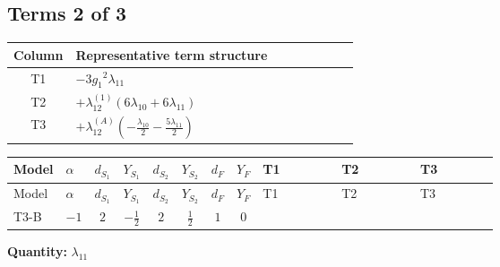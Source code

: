 \documentclass[8pt]{article}
\begin{document}
\begin{landscape}
\subsection*{Terms 2 of 3}
\begin{center}
\begin{tabular}{@{}c >{\raggedright\arraybackslash}p{0.82\linewidth}@{}}
\toprule
Column & Representative term structure \\
\midrule
T1 & \(\displaystyle -3 {g_1}^2 {\lambda_{11}}\) \\
\midrule
T2 & \(\displaystyle +{\lambda_{12}^{(1)}} (6 {\lambda_{10}}+6 {\lambda_{11}})\) \\
\midrule
T3 & \(\displaystyle +{\lambda_{12}^{(A)}} \left(-\frac{{\lambda_{10}}}{2}-\frac{5 {\lambda_{11}}}{2}\right)\) \\
\midrule
\bottomrule
\end{tabular}
\end{center}
\smallskip
\tiny
\begin{longtable}{@{}llcccccc >{\raggedright\arraybackslash}p{0.21\linewidth} >{\raggedright\arraybackslash}p{0.21\linewidth} >{\raggedright\arraybackslash}p{0.21\linewidth}@{}}
\toprule
Model & $\alpha$ & $d_{S_1}$ & $Y_{S_1}$ & $d_{S_2}$ & $Y_{S_2}$ & $d_F$ & $Y_F$ & T1 & T2 & T3 \\
\midrule
\endfirsthead
\toprule
Model & $\alpha$ & $d_{S_1}$ & $Y_{S_1}$ & $d_{S_2}$ & $Y_{S_2}$ & $d_F$ & $Y_F$ & T1 & T2 & T3 \\
\midrule
\endhead
T3-B & $-1$ & $2$ & $-\frac{1}{2}$ & $2$ & $\frac{1}{2}$ & $1$ & $0$ & \scriptsize\adjustbox{max width=\linewidth}{$\begin{gathered} -3 {g_1}^2 {\lambda_{11}}\end{gathered}$} & \scriptsize\adjustbox{max width=\linewidth}{$\begin{gathered} +{\lambda_{12}^{(1)}} (6 {\lambda_{10}}+6 {\lambda_{11}})\end{gathered}$} & \scriptsize\adjustbox{max width=\linewidth}{$\begin{gathered} +{\lambda_{12}^{(A)}} \left(-\frac{{\lambda_{10}}}{2}-\frac{5 {\lambda_{11}}}{2}\right)\end{gathered}$} \\
\midrule
\bottomrule
\end{longtable}
\clearpage
\noindent\textbf{Quantity: }$\lambda_{11}$\par\smallskip

\end{landscape}
\end{document}
